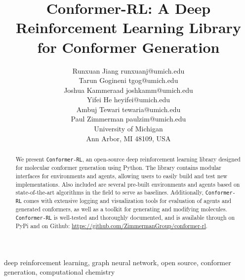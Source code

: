\documentclass[twoside,11pt]{article}
\newcommand{\code}[1]{\texttt{#1}}
\newcommand{\titleofpaper}{Conformer-RL}
\begin{document}
\title{\titleofpaper: A Deep Reinforcement Learning Library for Conformer Generation}

\author{\name Runxuan Jiang \email runxuanj@umich.edu \\
       \name Tarun Gogineni \email tgog@umich.edu \\
       \name Joshua Kammeraad \email joshkamm@umich.edu\\
       \name  Yifei He \email heyifei@umich.edu \\
       \name Ambuj Tewari \email tewaria@umich.edu\\
       \name Paul Zimmerman \email paulzim@umich.edu\\
       \addr
       University of Michigan\\
       Ann Arbor, MI 48109, USA} 

\maketitle

\newpage

\begin{abstract}%
  We present \code{\titleofpaper}, an open-source deep reinforcement learning library designed for molecular conformer generation using Python. The library contains modular interfaces for environments and agents, allowing users to easily build and test new implementations. Also included are several pre-built environments and agents based on state-of-the-art algorithms in the field to serve as baselines. Additionally, \code{\titleofpaper} comes with extensive logging and visualization tools for evaluation of agents and generated conformers, as well as a toolkit for generating and modifying molecules. \code{\titleofpaper} is well-tested and thoroughly documented, and is available through on PyPi and on Github: \url{https://github.com/ZimmermanGroup/conformer-rl}.
\end{abstract}

\begin{keywords}
  deep reinforcement learning, graph neural network, open source, conformer generation, computational chemistry
\end{keywords}
\end{document}
